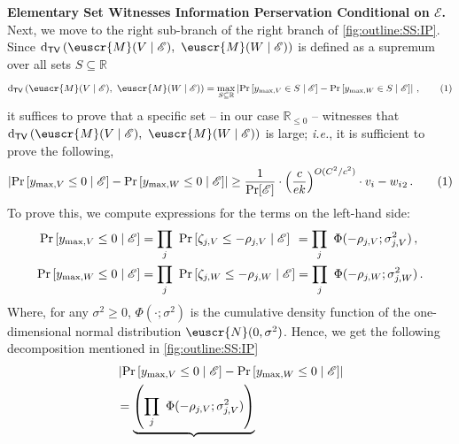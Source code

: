 \documentclass[11pt,letterpaper]{article}
\theoremstyle{plain}
\theoremstyle{definition}
\theoremstyle{remark}
\newcommand{\yesnum}{\addtocounter{equation}{1}\tag{\theequation}}
\def\abs#1{\left| #1 \right|}
\newcommand{\sinparen}[1]{\ensuremath{(#1)}}
\newcommand{\inparen}[1]{\ensuremath{\left(#1\right)}}
\newcommand{\insquare}[1]{\ensuremath{\left[#1\right]}}
\let\norm\relax
\newcommand{\norm}[1]{\ensuremath{\left\lVert #1 \right\rVert}}
\newcommand{\R}{\mathbb{R}}
\newcommand{\evE}{\ensuremath{\mathscr{E}}}
\newcommand{\tv}[2]{\operatorname{d}_{\mathsf{TV}}{\inparen{#1,#2}}}
\newcommand{\customcal}[1]{\euscr{#1}}
\newcommand{\cM}{\customcal{M}}
\newcommand{\cN}{\customcal{N}}
\renewcommand{\paragraph}[1]{\medskip \noindent\textbf{#1}~}
\newcommand{\ie}{\emph{i.e.}}
\newcommand{\customcdf}[2]{\Phi\sinparen{#1; \sigma_{#2}^2}}
\begin{document}
{{    {\paragraph{Elementary Set Witnesses Information Perservation Conditional on $\evE$.}
    Next, we move to the right sub-branch of the right branch of \cref{fig:outline:SS:IP}.
    }
    Since {$\tv{\cM(V\mid \evE)}{~\cM(W\mid \evE)}$ is defined as a supremum over all sets $S\subseteq\R$}
    \[
        \tv{\cM(V\mid \evE)}{~\cM(W\mid \evE)} 
        =
        \max_{S\subseteq \R}
            \abs{
                \Pr\insquare{y_{\max, V} \in S\mid \evE}
                -
                \Pr\insquare{y_{\max, W} \in S\mid \evE}
            }\,,
        \yesnum\label{eq:SS:conditionalTVExpression}
    \]
    it suffices to prove that {a specific set -- in our case $\R_{\leq 0}$ -- witnesses that $\tv{\cM(V\mid \evE)}{~\cM(W\mid \evE)} $ is large; \ie{}, it is sufficient to prove the following,}
    \[
        \abs{
            \Pr\insquare{y_{\max, V} \leq 0\mid \evE}
            -
            \Pr\insquare{y_{\max, W} \leq 0\mid \evE}
        }
        \geq 
        \frac{1}{\Pr[\evE]}
        \cdot {\inparen{\frac{c}{ek}}^{{O({C^2/c^2}){}}}}
        \cdot \norm{v_i-w_i}_2\,.
        \yesnum\label{eq:SS:probabilityDiff}
    \]
    To prove this, we compute expressions for the terms on the left-hand side:
    \begin{align*}
        \Pr\insquare{y_{\max, V} \leq 0\mid \evE}
        &= \prod_{j}~ 
            \Pr\insquare{\zeta_{j,V}\leq -\rho_{j,V}\mid \evE}
        ~\hspace{0.25mm}= 
            \prod_{j}~ \customcdf{-\rho_{j,V}}{j,V}
        \,,\\
        \Pr\insquare{y_{\max, W} \leq 0\mid \evE}
        &= \prod_{j}~ 
            \Pr\insquare{\zeta_{j,W}\leq -\rho_{j,W}\mid \evE}
        = \prod_{j}~ \customcdf{-\rho_{j,W}}{j,W}\,.
    \end{align*}
    Where, for any $\sigma^2\geq 0$, $\customcdf{\cdot}{}$ is the cumulative density function of the one-dimensional normal distribution $\cN(0,\sigma^2)$.
    {Hence, we get the following decomposition mentioned in \cref{fig:outline:SS:IP}}
    \begin{align*}
        \hspace{-2.5mm}
        &\abs{
                \Pr\insquare{y_{\max, V} \leq 0\mid \evE}
                - \Pr\insquare{y_{\max, W} \leq 0\mid \evE}
        } \\
        &= 
        \underbrace{\inparen{
            \prod_{j}~ \customcdf{-\rho_{j,V}}{j,V}
}}
\end{align*}}}
\end{document}
